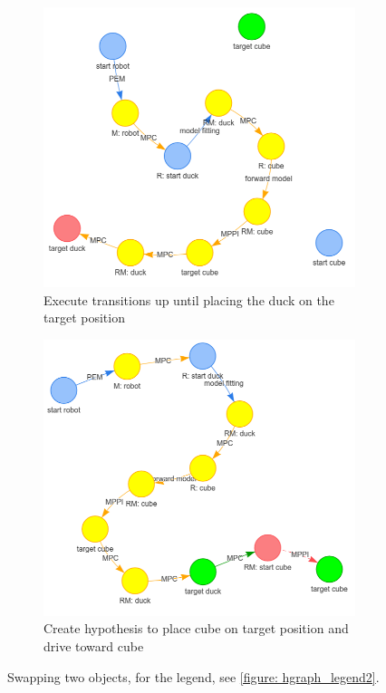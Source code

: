\begin{figure}[H]
    \begin{subfigure}[b]{0.49\textwidth}
         \centering
         \includegraphics[width=\textwidth]{figures/swap/5.png}
         \caption{Execute transitions up until placing the duck on the target position}
     \end{subfigure}
     \hfill
     \begin{subfigure}[b]{0.49\textwidth}
         \centering
         \includegraphics[width=\textwidth]{figures/swap/6.png}
         \caption{Create hypothesis to place cube on target position and drive toward cube}
     \end{subfigure}
     \caption{Swapping two objects, for the legend, see \cref{figure: hgraph_legend2}.}
     \label{figure: swap_hgraph}
\end{figure}

